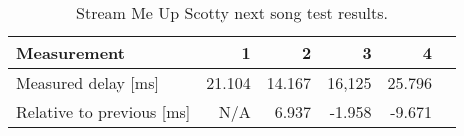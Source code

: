 \begin{table}[ht]
    \centering
    \begin{tabular}{|l|r|r|r|r|r|}
        \hline
        Measurement                 & 1         & 2         & 3        & 4        \\ \hline
        Measured delay [ms]         & 21.104    & 14.167    & 16,125   & 25.796   \\ \hline
        Relative to previous [ms]   & N/A       & 6.937     & -1.958   & -9.671   \\ \hline
    \end{tabular}
    \caption{Stream Me Up Scotty next song test results.}
    \label{fig:smus_pause_resume}
\end{table}
